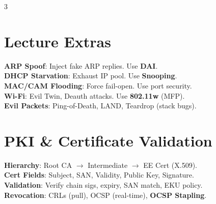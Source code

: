 \documentclass[10pt,landscape]{article}
\begin{document}
\begin{multicols*}{3}
\section*{Lecture Extras}
\textbf{ARP Spoof}: Inject fake ARP replies. Use \textbf{DAI}. \\
\textbf{DHCP Starvation}: Exhaust IP pool. Use \textbf{Snooping}. \\
\textbf{MAC/CAM Flooding}: Force fail-open. Use port security. \\
\textbf{Wi-Fi}: Evil Twin, Deauth attacks. Use \textbf{802.11w} (MFP). \\
\textbf{Evil Packets}: Ping-of-Death, LAND, Teardrop (stack bugs).

\section*{PKI \& Certificate Validation}
\textbf{Hierarchy}: Root CA $\to$ Intermediate $\to$ EE Cert (X.509). \\
\textbf{Cert Fields}: Subject, SAN, Validity, Public Key, Signature. \\
\textbf{Validation}: Verify chain sigs, expiry, SAN match, EKU policy. \\
\textbf{Revocation}: CRLs (pull), OCSP (real-time), \textbf{OCSP Stapling}.

\end{multicols*}
\end{document}
